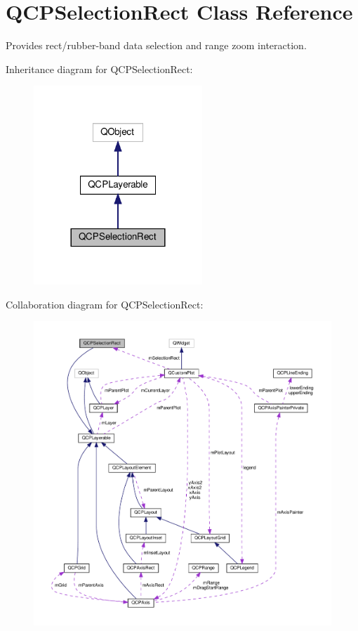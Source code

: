 \hypertarget{classQCPSelectionRect}{}\section{Q\+C\+P\+Selection\+Rect Class Reference}
\label{classQCPSelectionRect}


Provides rect/rubber-\/band data selection and range zoom interaction.  




Inheritance diagram for Q\+C\+P\+Selection\+Rect\+:\nopagebreak
\begin{figure}[H]
\begin{center}
\leavevmode
\includegraphics[width=180pt]{classQCPSelectionRect__inherit__graph}
\end{center}
\end{figure}


Collaboration diagram for Q\+C\+P\+Selection\+Rect\+:\nopagebreak
\begin{figure}[H]
\begin{center}
\leavevmode
\includegraphics[width=350pt]{classQCPSelectionRect__coll__graph}
\end{center}
\end{figure}
